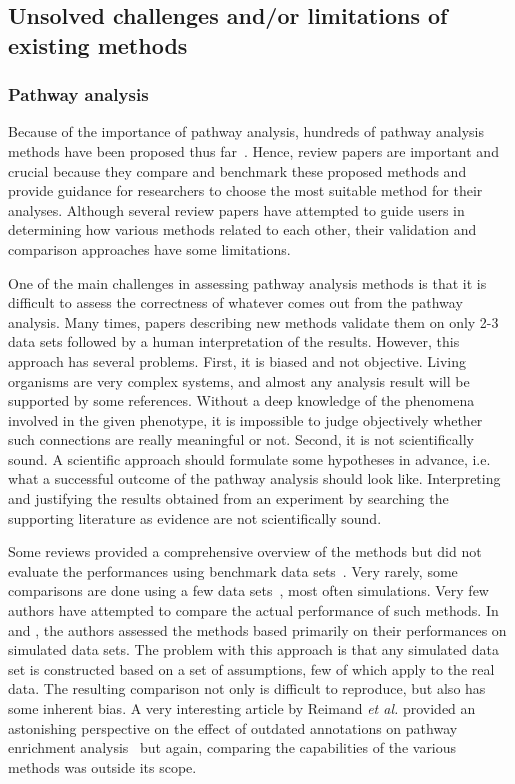\subsection{Unsolved challenges and/or limitations of existing methods}
\label{chap:ExisingMethodsLimitation}

\subsubsection{Pathway analysis}

Because of the importance of pathway analysis, hundreds of pathway analysis methods have been proposed thus far~\cite{DraghiciOntologicalToolsReview:2005,Khatri:2002,mitrea2013methods}.
Hence, review papers are important and crucial because they compare and benchmark these proposed methods and provide guidance for researchers to choose the most suitable method for their analyses.
Although several review papers have attempted to guide users in determining how various methods related to each other, their validation and comparison approaches have some limitations.

One of the main challenges in assessing pathway analysis methods is that it is difficult to assess the correctness of whatever comes out from the pathway analysis. Many times, papers describing new methods validate them on only 2-3 data sets followed by a human interpretation of the results.
However, this approach has several problems. First, it is biased and not objective. Living organisms are very complex systems, and almost any  analysis result will be supported by some references. Without a deep knowledge of the phenomena involved in the given phenotype, it is impossible to judge objectively whether such connections are really meaningful or not. Second, it is not scientifically sound. A scientific approach should formulate some hypotheses in advance, i.e. what a successful outcome of the pathway analysis should look like. Interpreting and justifying the results obtained from an experiment by searching the supporting literature as evidence are not scientifically sound.

Some reviews provided a comprehensive overview of the methods but did not evaluate the performances using benchmark data sets~\cite{mitrea2013methods, Khatri:2012}. 
%
Very rarely, some comparisons are done using a few data sets~\cite{bayerlova2015comparative}, most often simulations. 
Very few authors have attempted to compare the actual performance of such methods. 
In \cite{bayerlova2015comparative} and \cite{ihnatova2018critical}, the authors assessed the methods based primarily on their performances on simulated data sets.
The problem with this approach is that any simulated data set is constructed based on a set of assumptions, few of which apply to the real data. 
The resulting comparison not only is difficult to reproduce, but also has some inherent bias.
A very interesting article by Reimand \textit{et al.} provided an astonishing perspective on the effect of outdated annotations on pathway enrichment analysis~\cite{Wadi:2016} but again, comparing the capabilities of the various methods was outside its scope. 



